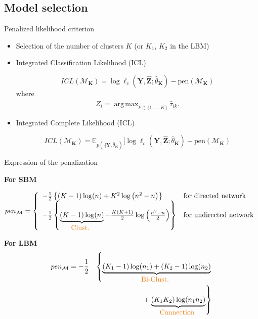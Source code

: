 \documentclass[compress,10pt]{beamer}
\DeclareMathOperator*{\argmax}{arg\,max}
\newcommand{\pen}{\mathrm{pen}}
\newcommand{\bY}{\mathbf{Y}}
\newcommand{\M}{\mathcal{M}_{\bK}}
\newcommand{\bK}{\mathbf{K}}
\newcommand{\Xall}{\mathbf{Y}}
\newcommand{\bZ}{\mathbf{Z}}
\begin{document}
 \subsection{Model selection}
 \begin{frame}{ Penalized likelihood criterion}

 \begin{itemize}
 \item  Selection of the number of clusters  $K$ (or $K_1$, $K_2$ in the LBM)
\item   Integrated Classification Likelihood (ICL)   \textcolor{mygreen}{\cite{biernacki2000assessing}}
 

\begin{equation}\label{eq:ICL}
ICL(\M) =\log  \ell_c(\Xall,\hat{\bZ}; \hat \theta_{\bK})-  \pen(\M)
\end{equation}
 where  \begin{equation}\label{eq:Zhat}
\hat{Z}_i = \argmax_{k \in \{1, \dots, K\}}  \hat{\tau}_{ik}. 
\end{equation} 
\item   Integrated Complete Likelihood (ICL)  %

 

\begin{equation}\label{eq:ICL}
ICL(\M) =\mathbb{E}_{p(\cdot | \bY, \hat \theta_{\bK})}[\log  \ell_c(\Xall,\hat{\bZ}; \hat \theta_{\bK})-  \pen(\M)
\end{equation}
 \end{itemize}

\end{frame}


 \begin{frame}{Expression of the penalization}
 
\textcolor{dgreen}{ \textbf{For SBM } }

$$ pen_{\mathcal{M}} = \left\{ 
\begin{array}{ll}
- \frac{1}{2}\left\{ (K-1)\log(n)  +K^2   \log \left( n^2-n \right)\right\} & \mbox{for directed network}\\
 - \frac{1}{2}\left\{ \underbrace{(K-1)\log(n) }_{\mbox{\textcolor{dgreen}{Clust. }}} + \frac{K(K+1)}{2}   \log \left(\frac{ n^2-n }{2}\right)\right\} & \mbox{for undirected network}\\
\end{array}
\right.
$$
 

\textcolor{dgreen}{ \textbf{For LBM } }
%
\begin{eqnarray*}
 pen_{\mathcal{M}} =  -  \frac{1}{2}&& \left\{  \underbrace{ (K_1-1)\log(n_1) +  (K_2-1)\log(n_2)  }_{\mbox{\textcolor{dgreen}{Bi-Clust. }}} \right. \\
& &  + \left. \underbrace{ (K_1  K_2)    \log ( n_1   n_2)} _{\mbox{\textcolor{dgreen}{Connection }}} \right\} 
 \end{eqnarray*}

\end{frame}
 
\end{document}
